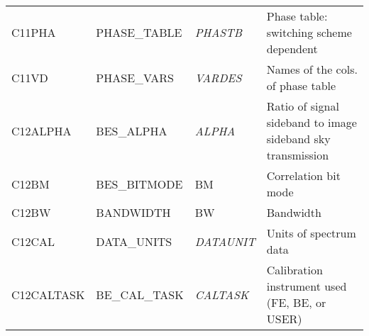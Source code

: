 \begin{sidewaystable*}
\begin{center}
\begin{tabular}{llll}
C11PHA & PHASE\_TABLE & \emph{PHASTB} & Phase table: switching scheme dependent\\
C11VD & PHASE\_VARS & \emph{VARDES} & Names of the cols. of phase table\\
C12ALPHA & BES\_ALPHA & \emph{ALPHA} & Ratio of signal sideband to image sideband sky transmission\\
C12BM & BES\_BITMODE & BM & Correlation bit mode\\
C12BW & BANDWIDTH & BW & Bandwidth\\
C12CAL & DATA\_UNITS & \emph{DATAUNIT} & Units of spectrum data\\
C12CALTASK & BE\_CAL\_TASK & \emph{CALTASK} & Calibration instrument used (FE, BE, or USER)\\

\hline
\end{tabular}
\end{center}
\end{sidewaystable*}


